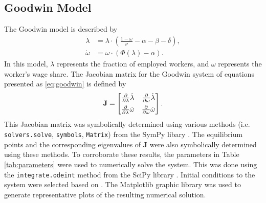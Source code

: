 \documentclass[12pt, centerh1]{article}
\begin{document}
\subsection{Goodwin Model}
The Goodwin model is described by
\begin{equation}\label{eq:goodwin} 
\begin{split}
    \dot{\lambda} &= \lambda \cdot \left( \frac{1-\omega}{\nu} - \alpha - \beta - \delta \right), \\
    \dot{\omega} &= \omega \cdot (\Phi(\lambda) - \alpha).
\end{split}
\end{equation}
In this model, $\lambda$ represents the fraction of employed workers, and $\omega$ represents the worker's wage share. The Jacobian matrix for the Goodwin system of equations presented as \eqref{eq:goodwin} is defined by
\begin{equation} \label{eq:goodwinJ}
\mathbf J =
\begin{bmatrix}
    \pdv{\lambda}\dot{\lambda} & \pdv{\omega}\dot{\lambda}\\[1ex]
    \pdv{\lambda}\dot{\omega} & \pdv{\omega}\dot{\omega}
\end{bmatrix}.
\end{equation}
This Jacobian matrix was symbolically determined using various methods (i.e. \texttt{solvers.solve}, \texttt{symbols}, \texttt{Matrix}) from the SymPy libary \citep{SymPy}.  The equilibrium points and the corresponding eigenvalues of $\mathbf J$ were also symbolically determined using these methods. To corroborate these results, the parameters in Table \ref{tab:parameters} were used to numerically solve the system. This was done using the \texttt{integrate.odeint} method from the SciPy library \citep{2020SciPy-NMeth}. Initial conditions to the system were selected based on \citet{grasselli2012analysis}. The Matplotlib \citep{matplotlib} graphic library was used to generate representative plots of the resulting numerical solution.
\end{document}
